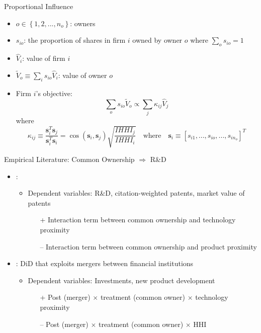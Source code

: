 \documentclass[
  10pt,
  aspectratio=169,   %
]{beamer}
\theoremstyle{plain}
\begin{document}
\begin{frame}{\cite{Rotemberg1984-jz} Proportional Influence}
  \label{rotemberg}
  \begin{itemize}
    \item $o\in\left\{ 1,2,...,n_{o}\right\} $: owners
    \item $s_{io}$: the proportion of shares in firm $i$ owned by owner $o$ where $\sum_{o}s_{io}=1$
    \item $\widehat{V}_{i}$: value of firm $i$
    \item $\widetilde{V}_{o}\equiv\sum_{i}s_{io}\widehat{V}_{i}$: value of owner $o$
    \item Firm $i$'s objective:
          \[
            \sum_{o}s_{io}\widetilde{V}_{o}\propto\sum_{j}\kappa_{ij}\widehat{V}_{j}
          \]
          where
          \[
            \kappa_{ij}\equiv\frac{\bm{s}_{i}^{T}\bm{s}_{j}}{\bm{s}_{i}^{T}\bm{s}_{i}} = \cos\left( \bm{s}_{i}, \bm{s}_{j} \right)\sqrt{\frac{IHHI_j}{IHHI_i}}
            \quad \text{where} \quad \bm{s}_{i}\equiv\left[s_{i1},...,s_{io},...,s_{in_{o}}\right]^{T}
          \]
  \end{itemize}
  \vfill %
  \hfill\hyperlink{ownership_weight}{} %
\end{frame}

\begin{frame}{Empirical Literature: Common Ownership $\Longrightarrow$ R\&D}
  \begin{itemize}
    \item \cite{Anton2024-pw}:
          \begin{itemize}
            \item Dependent variables: R\&D, citation-weighted patents, market value of patents
                  \begin{itemize}
                    \item[+] Interaction term between common ownership and technology proximity
                    \item[--] Interaction term between common ownership and product proximity
                  \end{itemize}
          \end{itemize} \medskip{}\pause
    \item \cite{Kini2024-kd}: DiD that exploits mergers between financial institutions
          \begin{itemize}
            \item Dependent variables: Investments, new product development
                  \begin{itemize}
                    \item[+] Post (merger) $\times$ treatment (common owner) $\times$ technology proximity
                    \item[--] Post (merger) $\times$ treatment (common owner) $\times$ HHI
                  \end{itemize}
          \end{itemize}
  \end{itemize}
\end{frame}
\end{document}
